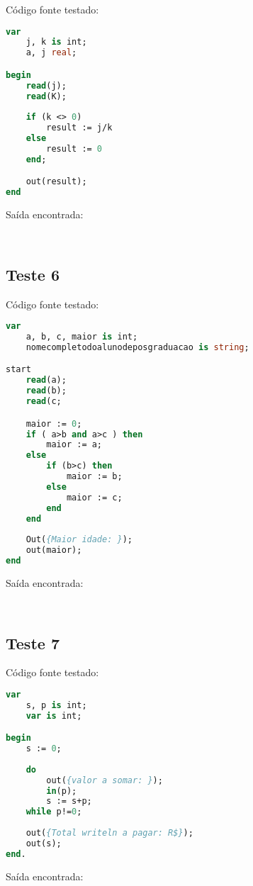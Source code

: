 \documentclass[11pt]{article}
\begin{document}
Código fonte testado:
\begin{lstlisting}[language=Pascal]
var
	j, k is int;
	a, j real;

begin
	read(j);
	read(K);
	
	if (k <> 0)
		result := j/k
	else
		result := 0
	end;

 	out(result);
end
\end{lstlisting}
	
Saída encontrada:
\begin{verbatim}
	
\end{verbatim}




\subsection{Teste 6}

Código fonte testado:
\begin{lstlisting}[language=Pascal]
var
	a, b, c, maior is int;
	nomecompletodoalunodeposgraduacao is string;

start
	read(a);
	read(b);
	read(c;

	maior := 0;
	if ( a>b and a>c ) then
		maior := a;
	else
		if (b>c) then
			maior := b;
		else
			maior := c;
		end
	end
	
	Out({Maior idade: });
	out(maior);
end
\end{lstlisting}
	
Saída encontrada:
\begin{verbatim}
	
\end{verbatim}




\subsection{Teste 7}

Código fonte testado:
\begin{lstlisting}[language=Pascal]
var
    s, p is int;
    var is int;

begin
    s := 0;
    
    do
        out({valor a somar: });
        in(p);
        s := s+p;
    while p!=0;
    
    out({Total writeln a pagar: R$});
    out(s);
end.
\end{lstlisting}
	
Saída encontrada:
\begin{verbatim}
	
\end{verbatim}
\end{document}

